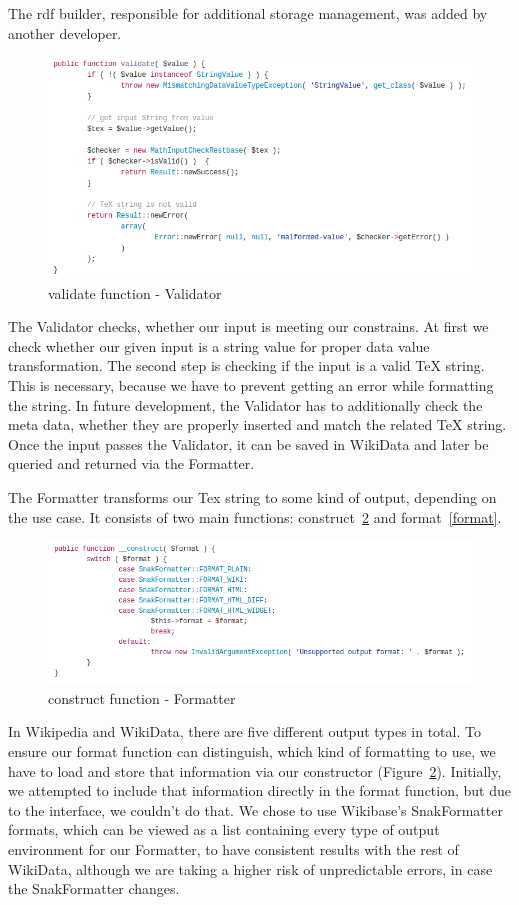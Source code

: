 \documentclass[12pt]{article}
\begin{document}
The rdf builder, responsible for additional storage management, was added by another developer.

\begin{figure}
\includegraphics[width = \textwidth]{validate}
\caption{validate function - Validator}
\label{validate}
\end{figure}
The Validator checks, whether our input is meeting our constrains. At first we check whether our given input is a string value for proper data value transformation.
The second step is checking if the input is a valid TeX string. This is necessary, because we have to prevent getting an error while formatting the string. In future development, the Validator has to additionally check the meta data, whether they are properly inserted and match the related TeX string.
Once the input passes the Validator, it can be saved in WikiData and later be queried and returned via the Formatter.

The Formatter transforms our Tex string to some kind of output, depending on the use case. It consists of two main functions: construct~\ref{construct} and format~\ref{format}.
\begin{figure}[h]
\includegraphics[width = \textwidth]{formatterconstruct}
\caption{construct function - Formatter}
\label{construct}
\end{figure}

In Wikipedia and WikiData, there are five different output types in total. To ensure our format function can distinguish, which kind of formatting to use, we have to load and store that information via our constructor (Figure~\ref{construct}). Initially, we attempted to include that information directly in the format function, but due to the interface, we couldn't do that. We chose to use Wikibase's  SnakFormatter formats, which can be viewed as a list containing every type of output environment for our Formatter, to have consistent results with the rest of WikiData, although we are taking a higher risk of unpredictable errors, in case the SnakFormatter changes.
\end{document}
